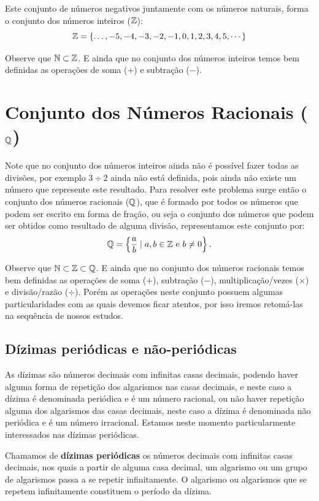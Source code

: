 Este conjunto de números negativos juntamente com os números naturais, forma o conjunto dos números inteiros ($\mathbb{Z}$):
\[\mathbb{Z}= \{ \ldots , -5, -4, -3, -2, -1, 0, 1, 2, 3, 4, 5, \cdots \}\]

Observe que $\mathbb{N} \subset \mathbb{Z}$. E ainda que no conjunto dos números inteiros temos bem definidas as operações de soma ($+$) e subtração ($-$).

\section{Conjunto dos Números Racionais (\texorpdfstring{$\mathbb{Q}$}{Q})}

Note que no conjunto dos números inteiros ainda não é possível fazer todas as divisões, por exemplo $3 \div 2$ ainda não está definida, pois ainda não existe um número que represente este resultado. Para resolver este problema surge então o conjunto dos números racionais ($\mathbb{Q}$), que é formado por todos os números que podem ser escrito em forma de fração, ou seja o conjunto dos números que podem ser obtidos como resultado de alguma divisão, representamos este conjunto por:
\[\mathbb{Q}= \left\{ \frac{a}{b} \mid a, b \in \mathbb{Z} \text{ e } b \neq 0 \right\}.\]

Observe que $\mathbb{N} \subset \mathbb{Z} \subset \mathbb{Q}$. E ainda que no conjunto dos números racionais temos bem definidas as operações de soma ($+$), subtração ($-$), multiplicação/vezes ($\times$) e divisão/razão ($\div$). Porém as operações neste conjunto possuem algumas particularidades com as quais devemos ficar atentos, por isso iremos retomá-las na sequência de nossos estudos.

\subsection{Dízimas periódicas e não-periódicas}
As dízimas são números decimais com infinitas casas decimais, podendo haver alguma forma de repetição dos algarismos nas casas decimais, e neste caso a dízima é denominada periódica e é um número racional, ou não haver repetição alguma dos algarismos das casas decimais, neste caso a dízima é denominada não periódica e é um número irracional. Estamos neste momento particularmente interessados nas dízimas periódicas.

 \vskip0.3cm
 \colorbox{azul}{
 \begin{minipage}{0.9\linewidth}
 \begin{center}
  Chamamos de \textbf{dízimas periódicas} os números decimais com infinitas casas decimais, nos quais a partir de alguma casa decimal, um algarismo ou um grupo de algarismos passa a se repetir infinitamente. O algarismo ou algarismos que se repetem infinitamente constituem o período da dízima.
 \end{center}
 \end{minipage}}
 \vskip0.3cm

